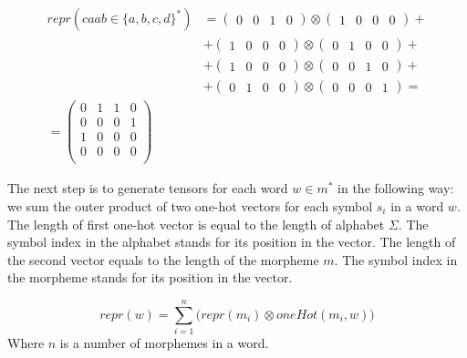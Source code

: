\documentclass[leqno]{article}
\begin{document}
\begin{equation}
    \begin{aligned}
        repr(caab \in \{a, b, c, d\}^*) &= 
        \begin{pmatrix} 0 & 0 & 1 & 0 \end{pmatrix}
        \otimes \begin{pmatrix} 1 & 0 & 0 & 0 \end{pmatrix} + \\
        &+ \begin{pmatrix} 1 & 0 & 0 & 0 \end{pmatrix}
        \otimes \begin{pmatrix} 0 & 1 & 0 & 0 \end{pmatrix} + \\
        &+ \begin{pmatrix} 1 & 0 & 0 & 0 \end{pmatrix}
        \otimes \begin{pmatrix} 0 & 0 & 1 & 0 \end{pmatrix} + \\
        &+ \begin{pmatrix} 0 & 1 & 0 & 0 \end{pmatrix}
        \otimes \begin{pmatrix} 0 & 0 & 0 & 1 \end{pmatrix} = \\
        = \begin{pmatrix}
        0 & 1 & 1 & 0 \\
        0 & 0 & 0 & 1 \\
        1 & 0 & 0 & 0 \\
        0 & 0 & 0 & 0 \\
        \end{pmatrix}
    \end{aligned}
\end{equation}

The next step is to generate tensors for each word $w \in m^*$ in the following way: we sum the outer product of two one-hot vectors for each symbol $s_i$ in a word $w$. The length of first one-hot vector is equal to the length of alphabet $\Sigma$. The symbol index in the alphabet stands for its position in the vector. The length of the second vector equals to the length of the morpheme $m$. The symbol index in the morpheme stands for its position in the vector.

\begin{equation}
    repr(w) = \sum_{i=1}^{n}
    \bigg(repr(m_i) \otimes oneHot(m_i, w)\bigg)
\end{equation}
Where $n$ is a number of morphemes in a word.
\end{document}

